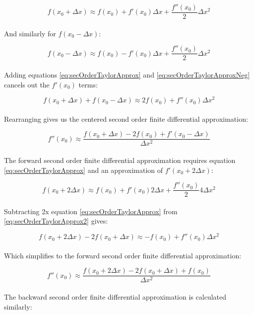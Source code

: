 {   \begin{equation}\label{eq:secOrderTaylorApprox}
  f(x_{0} + \Delta  x) \approx f(x_{0}) + f'(x_{0})\Delta  x + \frac{f''(x_{0})}{2}\Delta  x^{2}
  \end{equation}
    \\
  And similarly for  $f(x_{0} - \Delta  x)$:
  
     \begin{equation}\label{eq:secOrderTaylorApproxNeg}
  f(x_{0} - \Delta  x) \approx f(x_{0}) - f'(x_{0})\Delta  x + \frac{f''(x_{0})}{2}\Delta  x^{2}
  \end{equation}
    \\
  Adding equations \ref{eq:secOrderTaylorApprox} and \ref{eq:secOrderTaylorApproxNeg} cancels out the $f'(x_{0})$ terms:
  
   \begin{equation}
  f(x_{0} + \Delta  x) + f(x_{0} - \Delta  x) \approx 2f(x_{0}) + f''(x_{0})\Delta  x^{2}
  \end{equation}
    \\
  Rearranging gives us the centered second order finite differential approximation:
  
   \begin{equation}
   f''(x_{0}) \approx \frac{f(x_{0} + \Delta  x) - 2f(x_{0}) + f'(x_{0} -\Delta  x)}{\Delta  x^{2}}
  \end{equation}
    \\
  The forward second order finite differential approximation requires equation \ref{eq:secOrderTaylorApprox} and an approximation of $f'(x_{0} + 2\Delta  x)$:
  
  \begin{equation}\label{eq:secOrderTaylorApprox2}
  f(x_{0} + 2\Delta  x) \approx f(x_{0}) + f'(x_{0})2\Delta  x + \frac{f''(x_{0})}{2}4\Delta  x^{2}
  \end{equation}
    \\
  Subtracting 2x equation \ref{eq:secOrderTaylorApprox} from \ref{eq:secOrderTaylorApprox2} gives:
  
    \begin{equation}
  f(x_{0} + 2\Delta  x) - 2f(x_{0} + \Delta  x) \approx -f(x_{0}) + f''(x_{0})\Delta  x^{2}
  \end{equation}
  \\
Which simplifies to the forward second order finite differential approximation:
  
      \begin{equation}
f''(x_{0}) \approx \frac{f(x_{0} + 2\Delta  x) - 2f(x_{0} + \Delta  x) + f(x_{0})}{\Delta  x^{2}}
  \end{equation}
  \\
  The backward second order finite differential approximation is calculated similarly:
  
}
